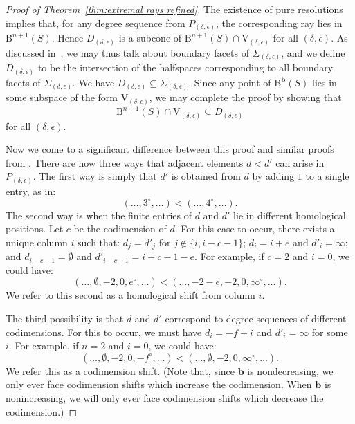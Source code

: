 \documentclass[12pt]{amsart}
\theoremstyle{definition}
\theoremstyle{remark}
\newcommand{\VV}{\mathrm{V}}
\newcommand{\bb}{\mathbf{b}}
\newcommand{\defi}[1]{\textsf{#1}} %
\newcommand{\BBQ}{\mathrm{B}}
\begin{document}
\begin{proof}[Proof of Theorem~\ref{thm:extremal rays refined}]
The existence of pure resolutions~\cite[Theorem~0.1]{eis-schrey1} implies that, for any degree sequence from $P_{(\delta,\epsilon)}$, the corresponding ray lies in $\BBQ^{n+1}(S)$.  Hence $D_{(\delta,\epsilon)}$ is a subcone of $\BBQ^{n+1}(S)\cap \VV_{(\delta,\epsilon)}$ for all $(\delta,\epsilon)$.  
As discussed in~\cite[Appendix A]{bbeg}, we may thus talk about boundary facets of $\Sigma_{(\delta,\epsilon)}$, and we define $D_{(\delta,\epsilon)}$ to be the intersection of the halfspaces corresponding to all boundary facets of $\Sigma_{(\delta,\epsilon)}$.  We have $D_{(\delta,\epsilon)} \subseteq \Sigma_{(\delta,\epsilon)}$.
Since any point of $\BBQ^{\bb}(S)$ lies in some subspace of the form $\VV_{(\delta,\epsilon)}$, we may complete the proof by showing that
\[
\BBQ^{n+1}(S)\cap \VV_{(\delta,\epsilon)} \subseteq D_{(\delta,\epsilon)}
\]
for all $(\delta,\epsilon)$.  

Now we come to a significant difference between this proof and similar proofs from \cites{eis-schrey1,boij-sod2}.  There are now three ways that  adjacent elements $d<d'$ can arise in $P_{(\delta,\epsilon)}$.   The first way is simply that $d'$ is obtained from $d$ by adding $1$ to a single entry, as in:
\[
(\dots,3^\circ,\dots)<(\dots,4^\circ,\dots).
\]
The second way is when the finite entries of $d$ and $d'$ lie in different homological positions.  Let $c$ be the codimension of $d$.  For this case to occur, there exists a unique column $i$ such that: $d_j=d'_j$ for $j\notin \{i, i-c-1\}$; $d_i=i+e$ and $d'_i=\infty$; and $d_{i-c-1}=\emptyset$ and $d'_{i-c-1}=i-c-1-e$.  For example, if $c=2$ and $i=0$, we could have:
\[
(\dots, \emptyset, -2, 0, e^\circ, \dots)<(\dots, -2-e,-2, 0, \infty^\circ, \dots).
\]
We refer to this second as a \defi{homological shift from column $i$}.

The third possibility is that $d$ and $d'$ correspond to degree sequences of different codimensions.  For this to occur, we must have $d_{i}=-f+i$ and $d'_i=\infty$ for some $i$.  
For example, if $n=2$ and $i=0$, we could have:
\[
(\dots, \emptyset, -2, 0, -f^\circ, \dots)<(\dots, \emptyset,-2, 0, \infty^\circ, \dots).
\]
We refer this as a \defi{codimension shift}.  (Note that, since $\bb$ is nondecreasing, we only ever face codimension shifts which increase the codimension.  When $\bb$ is nonincreasing, we will only ever face codimension shifts which decrease the codimension.)



\end{proof}
\end{document}
